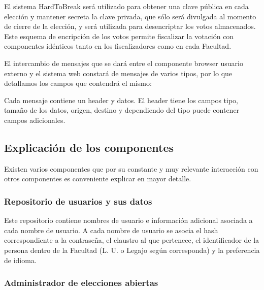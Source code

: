 El sistema HardToBreak será utilizado para obtener una clave pública en cada elección y mantener secreta la clave privada, que sólo será divulgada al momento de cierre de la elección, y será utilizada para desencriptar los votos almacenados. 
Este esquema de encripción de los votos permite fiscalizar la votación con componentes idénticos tanto en los fiscalizadores como en cada Facultad.



El intercambio de mensajes que se dará entre el componente browser usuario externo y el sistema web constará de mensajes de varios tipos, por lo que detallamos los campos que contendrá el mismo:

Cada mensaje contiene un header y datos. El header tiene los campos tipo, tamaño de los datos, origen, destino y dependiendo del tipo puede contener campos adicionales. 

\subsection{Explicación de los componentes}
\label{explicaciones}
Existen varios componentes que por su constante y muy relevante interacción con otros componentes es conveniente explicar en mayor detalle.

\subsubsection{Repositorio de usuarios y sus datos}


Este repositorio contiene nombres de usuario e información adicional asociada a cada nombre de usuario. A cada nombre de usuario se asocia el hash correspondiente a la contraseña, el claustro al que pertenece, el identificador de la persona dentro de la Facultad (L. U. o Legajo según corresponda) y la preferencia de idioma. 


\subsubsection{Administrador de elecciones abiertas}

\label{admin_elecciones}

